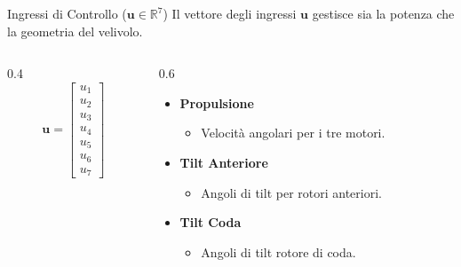 \documentclass[aspectratio=169]{beamer} %
\begin{document}
\begin{frame}{Ingressi di Controllo ($\mathbf{u} \in \mathbb{R}^7$)}
    Il vettore degli ingressi $\mathbf{u}$ gestisce sia la potenza che la geometria del velivolo.

    \vspace{0.5cm}
    \begin{columns}[c]
        \begin{column}{0.4\textwidth}
            \centering
            \begin{equation}
                \mathbf{u} = \begin{bmatrix} 
                u_1 \\ u_2 \\ u_3 \\ \hline
                u_4 \\ u_5 \\ \hline
                u_6 \\ u_7 
                \end{bmatrix}
            \end{equation}
        \end{column}

        \begin{column}{0.6\textwidth}
            \begin{itemize}
                \item[] \textbf{Propulsione}
                \begin{itemize}
                    \item[$u_{1-3}$:] Velocità angolari per i tre motori.
                \end{itemize}
                \vspace{0.3cm}
                \item[] \textbf{Tilt Anteriore}
                \begin{itemize}
                    \item[$u_{4,5}$:] Angoli di tilt per rotori anteriori.
                \end{itemize}
                \vspace{0.3cm}
                \item[] \textbf{Tilt Coda}
                \begin{itemize}
                    \item[$u_{6,7}$:] Angoli di tilt rotore di coda.
                \end{itemize}
            \end{itemize}
        \end{column}
    \end{columns}
\end{frame}
\end{document}
